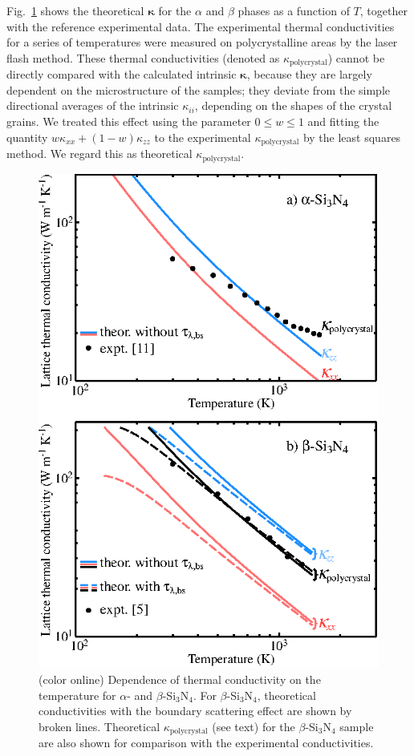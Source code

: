 \documentclass[twocolumn,amsmath,amssymb,a4paper,prb,superscriptaddress,floatfix]{revtex4-1}
\begin{document}
Fig.~\ref{fig:Fig1_338} shows the theoretical $\boldsymbol{\kappa}$ for the
$\alpha$ and $\beta$ phases as a function of $T$, together with the reference
experimental data\cite{hirosaki,hirai}. The experimental thermal conductivities
for a series of temperatures were measured on polycrystalline areas
by the laser flash method. These thermal conductivities (denoted as
$\kappa_\mathrm{polycrystal}$) cannot be directly compared with the calculated
intrinsic $\boldsymbol{\kappa}$, because they are largely dependent on the
microstructure of the samples; they deviate from the simple directional
averages of the intrinsic $\kappa_{ii}$, depending on the shapes of the crystal
grains. We treated this effect using the parameter $0\le{w}\le{1}$ and fitting
the quantity $w\kappa_{xx} + (1-w) \kappa_{zz}$ to the experimental
$\kappa_\mathrm{polycrystal}$ by the least squares method. We regard this as
theoretical $\kappa_\mathrm{polycrystal}$. 

\begin{figure}[ht]
 \begin{center}
  \includegraphics[width=0.90\linewidth]{Fig1_m1010.eps} \caption{(color
  online) Dependence of thermal conductivity on the temperature for $\alpha$- and
  $\beta$-Si$_3$N$_4$. For $\beta$-Si$_3$N$_4$, theoretical conductivities with the
  boundary scattering effect are shown by broken lines. Theoretical
  $\kappa_\mathrm{polycrystal}$ 
  (see text) for the $\beta$-Si$_3$N$_4$ sample are
  also shown for comparison with the experimental conductivities.}
  \label{fig:Fig1_338}
 \end{center}
\end{figure}
\end{document}
